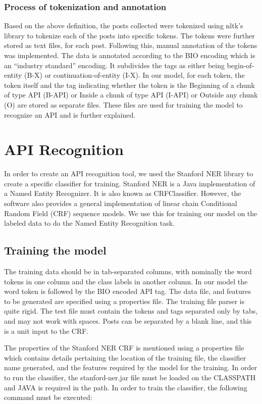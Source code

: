 \documentclass{sig-alternate-05-2015}
\begin{document}
\subsubsection{Process of tokenization and annotation}

Based on the above definition, the posts collected were tokenized using nltk’s library to tokenize each of the posts into specific tokens. The tokens were further stored as text files, for each post. Following this, manual annotation of the tokens was implemented. The data is annotated according to the BIO encoding which is an “industry standard” encoding. \cite{ramshaw1995text} \cite{ratnaparkhi1998maximum}
It subdivides the tags as either being begin-of-entity {(B-X)} or continuation-of-entity {(I-X)}. In our model, for each token, the token itself and the tag indicating whether the token is the Beginning of a chunk of type API (B-API) or Inside a chunk of type API (I-API) or Outside any chunk (O) are stored as separate files. These files are used for training the model to recognize an API and is further explained. 


\section{API Recognition}
In order to create an API recognition tool, we used the Stanford NER library \cite{stanfordNER} to create a specific classifier for training. Stanford NER is a Java implementation of a Named Entity Recognizer. It  is also known as CRFClassifier. However, the software also provides a general implementation of linear chain Conditional Random Field (CRF) sequence models. We use this for training our model on the labeled data to do the Named Entity Recognition task.

\subsection{Training the model}
The training data should be in tab-separated columns, with nominally the word tokens in one column and the class labels in another column. In our model the word token is followed by the BIO encoded API tag. The data file, and features to be generated are specified using a properties file.  The training file parser is quite rigid. The test file must contain the tokens and tags separated only by tabs, and may not work with spaces. Posts can be separated by a blank line, and this is a unit input to the CRF. 


The properties of the Stanford NER CRF is mentioned using a properties file which contains details pertaining the location of the training file, the classifier name generated, and the features required by the model for the training. In order to run the classifier, the stanford-ner.jar file must be loaded on the CLASSPATH and JAVA is required in the path. In order to train the classifier, the following command must be executed: 
\end{document}

